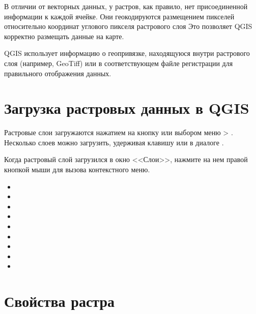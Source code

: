 В отличии от векторных данных, у растров, как правило, нет присоединенной
информации к каждой ячейке. Они геокодируются размещением пикселей
относительно координат углового пикселя растрового слоя Это позволяет
QGIS корректно размещать данные на карте.

QGIS использует информацию о геопривязке, находящуюся внутри растрового
слоя (например, GeoTiff) или в соответствующем файле регистрации для
правильного отображения данных.

\section{Загрузка растровых данных в QGIS}\label{label_loadraster}

Растровые слои загружаются нажатием на кнопку
 или выбором меню
 >
.
Несколько слоев можно загрузить, удерживая клавишу 
или  в диалоге .

Когда растровый слой загрузился в окно <<Слои>>, нажмите на нем правой
кнопкой мыши для вызова контекстного меню.


\begin{itemize}[label=--]
\item {}
\item {}
\item {}
\item {}
\item {}
\item {}
\item {}
\item {}
\item {}
\end{itemize}

\section{Свойства растра}\label{label_rasterprop}


